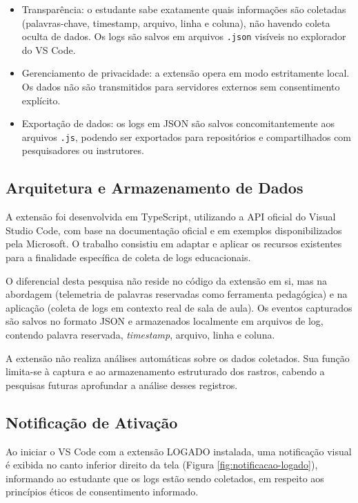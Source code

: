 \begin{itemize}
    \item Transparência: o estudante sabe exatamente quais informações são coletadas (palavras-chave, timestamp, arquivo, linha e coluna), não havendo coleta oculta de dados. Os logs são salvos em arquivos \texttt{.json} visíveis no explorador do VS Code.

    \item Gerenciamento de privacidade: a extensão opera em modo estritamente local. Os dados não são transmitidos para servidores externos sem consentimento explícito.

    \item Exportação de dados: os logs em JSON são salvos concomitantemente aos arquivos \texttt{.js}, podendo ser exportados para repositórios e compartilhados com pesquisadores ou instrutores.
\end{itemize}

\subsection{Arquitetura e Armazenamento de Dados}

A extensão foi desenvolvida em TypeScript, utilizando a API oficial do Visual Studio Code, com base na documentação oficial e em exemplos disponibilizados pela Microsoft. O trabalho consistiu em adaptar e aplicar os recursos existentes para a finalidade específica de coleta de logs educacionais.

O diferencial desta pesquisa não reside no código da extensão em si, mas na abordagem (telemetria de palavras reservadas como ferramenta pedagógica) e na aplicação (coleta de logs em contexto real de sala de aula). Os eventos capturados são salvos no formato JSON e armazenados localmente em arquivos de log, contendo palavra reservada, \textit{timestamp}, arquivo, linha e coluna.

A extensão não realiza análises automáticas sobre os dados coletados. Sua função limita-se à captura e ao armazenamento estruturado dos rastros, cabendo a pesquisas futuras aprofundar a análise desses registros.

\subsection{Notificação de Ativação}

Ao iniciar o VS Code com a extensão LOGADO instalada, uma notificação visual é exibida no canto inferior direito da tela (Figura \ref{fig:notificacao-logado}), informando ao estudante que os logs estão sendo coletados, em respeito aos princípios éticos de consentimento informado.


